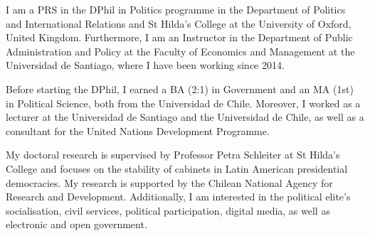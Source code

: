 




\vspace{3mm}

\begin{cvparagraph}

I am a PRS in the DPhil in Politics programme in the Department of Politics and International Relations and St Hilda’s College at the University of Oxford, United Kingdom. Furthermore, I am an Instructor in the Department of Public Administration and Policy at the Faculty of Economics and Management at the Universidad de Santiago, where I have been working since 2014.

Before starting the DPhil, I earned a BA (2:1) in Government and an MA (1st) in Political Science, both from the Universidad de Chile. Moreover, I worked as a lecturer at the Universidad de Santiago and the Universidad de Chile, as well as a consultant for the United Nations Development Programme.

My doctoral research is supervised by Professor Petra Schleiter at St Hilda’s College and focuses on the stability of cabinets in Latin American presidential democracies. My research is supported by the Chilean National Agency for Research and Development. Additionally, I am interested in the political elite’s socialisation, civil services, political participation, digital media, as well as electronic and open government.
\vspace{1mm}
\end{cvparagraph}
